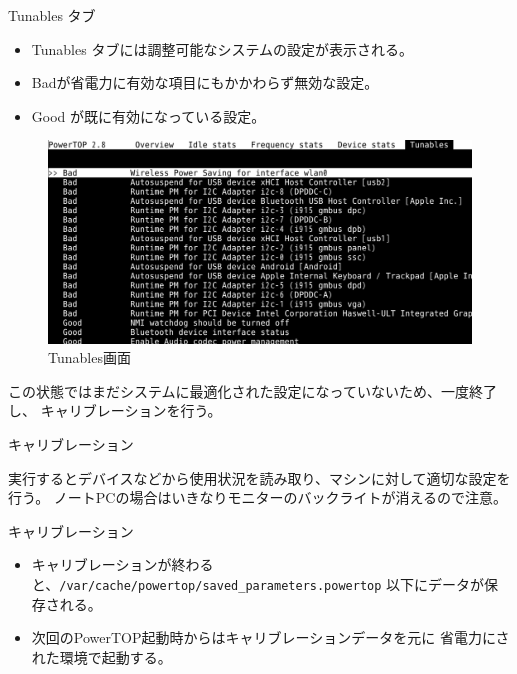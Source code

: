 \begin{frame}[containsverbatim]{Tunables タブ}
\begin{itemize}
\item Tunables タブには調整可能なシステムの設定が表示される。
\item Badが省電力に有効な項目にもかかわらず無効な設定。
\item Good が既に有効になっている設定。
\end{itemize}

\begin{figure}[H]
\begin{center}
\includegraphics[width=0.8\hsize]{image201602/powertop_01.png}
\end{center}
\label{fig:powertop1}
\caption{Tunables画面} 
\end{figure}

この状態ではまだシステムに最適化された設定になっていないため、一度終了し、
キャリブレーションを行う。

\end{frame}

\begin{frame}[containsverbatim]{キャリブレーション}

実行するとデバイスなどから使用状況を読み取り、マシンに対して適切な設定を
行う。
ノートPCの場合はいきなりモニターのバックライトが消えるので注意。


\end{frame}

\begin{frame}[containsverbatim]{キャリブレーション}

\begin{itemize}
\item キャリブレーションが終わると、\texttt{/var/cache/powertop/saved\_parameters.powertop}
以下にデータが保存される。
\item 次回のPowerTOP起動時からはキャリブレーションデータを元に
省電力にされた環境で起動する。
\end{itemize}

\end{frame}

